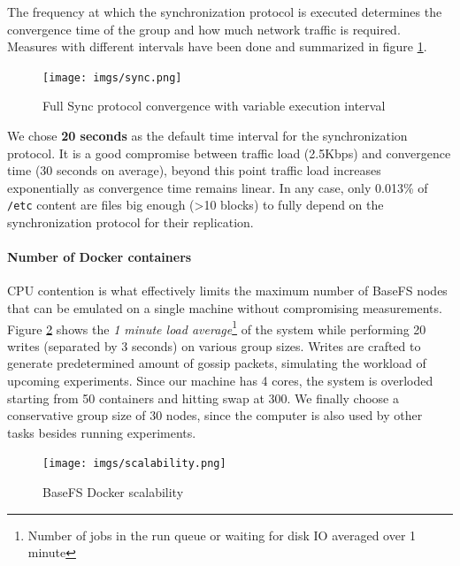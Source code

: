 \documentclass{sig-alternate}
\begin{document}
The frequency at which the synchronization protocol is executed determines the convergence time of the group and how much network traffic is required. Measures with different intervals have been done and summarized in figure \ref{fig:sync}.

\begin{figure}
\centering
\texttt{[image: imgs/sync.png]}
\caption{Full Sync protocol convergence with variable execution interval}
\label{fig:sync}
\end{figure}

We chose \textbf{20 seconds} as the default time interval for the synchronization protocol. It is a good compromise between traffic load (2.5Kbps) and convergence time (30 seconds on average), beyond this point traffic load increases exponentially as convergence time remains linear. In any case, only 0.013\% of \texttt{/etc} content are files big enough (>10 blocks) to fully depend on the synchronization protocol for their replication.


\paragraph{Number of Docker containers}

CPU contention is what effectively limits the maximum number of BaseFS nodes that can be emulated on a single machine without compromising measurements. Figure \ref{fig:scalability} shows the \textit{1 minute load average}\footnote{Number of jobs in the run queue or waiting for disk IO averaged over 1 minute} of the system while performing 20 writes (separated by 3 seconds) on various group sizes. Writes are crafted to generate predetermined amount of gossip packets, simulating the workload of upcoming experiments. Since our machine has 4 cores, the system is overloded starting from 50 containers and hitting swap at 300. We finally choose a conservative group size of 30 nodes, since the computer is also used by other tasks besides running experiments.


\begin{figure}
\centering
\texttt{[image: imgs/scalability.png]}
\caption{BaseFS Docker scalability}
\label{fig:scalability}
\end{figure}


\end{document}
